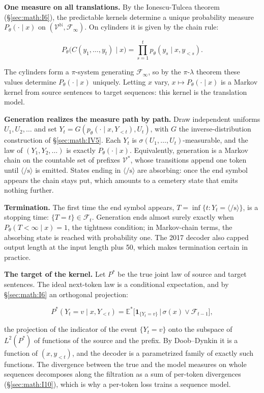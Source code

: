 \textbf{One measure on all translations.} By the Ionescu-Tulcea theorem
(\S\ref{sec:math:I6}), the predictable kernels determine a unique probability measure
\(P_\theta(\cdot \mid x)\) on \((\mathcal{V}^{\mathbb{N}}, \mathcal{F}_\infty)\). On cylinders
it is given by the chain rule:

\[
P_\theta\big(C(y_1,\dots,y_t)\mid x\big) = \prod_{s=1}^{t} p_\theta(y_s \mid x, y_{<s}).
\]

The cylinders form a \(\pi\)-system generating \(\mathcal{F}_\infty\), so by the \(\pi\)-\(\lambda\) theorem
these values determine \(P_\theta(\cdot \mid x)\) uniquely. Letting \(x\) vary, \(x \mapsto P_\theta(\cdot
\mid x)\) is a Markov kernel from source sentences to target sequences: this
kernel is the translation model.

\textbf{Generation realizes the measure path by path.} Draw independent
uniforms \(U_{1}, U_{2}, \ldots\) and set \(Y_t = G(p_\theta(\cdot \mid x,
Y_{<t}), U_t)\), with \(G\) the inverse-distribution construction
of \S\ref{sec:math:IV5}. Each \(Y_t\) is \(\sigma(U_1, \ldots, U_t)\)-measurable, and the law of \((Y_{1},
Y_{2}, \ldots)\) is exactly \(P_\theta(\cdot \mid x)\). Equivalently, generation is a
Markov chain on the countable set of prefixes \(\mathcal{V}^*\), whose
transitions append one token until \(\langle/\mathrm{s}\rangle\) is emitted. States ending in
\(\langle/\mathrm{s}\rangle\) are absorbing: once the end symbol appears the chain stays
put, which amounts to a cemetery state that emits nothing further.

\textbf{Termination.} The first time the end symbol appears, \(T = \inf\{t
: Y_t = \langle/\mathrm{s}\rangle\}\), is a stopping time: \(\{T = t\} \in \mathcal{F}_t\). Generation ends
almost surely exactly when \(P_\theta(T < \infty \mid x) = 1\), the tightness
condition; in Markov-chain terms, the absorbing state is reached with
probability one. The 2017 decoder also capped output length at the input
length plus 50, which makes termination certain in practice.

\textbf{The target of the kernel.} Let \(P^*\) be the true joint law of
source and target sentences. The ideal next-token law is a conditional
expectation, and by \S\ref{sec:math:I6} an orthogonal projection:

\[
P^*(Y_t = v \mid x, Y_{<t}) = \mathbb E^*\big[\mathbf 1_{\{Y_t = v\}} \,\big|\, \sigma(x)\vee\mathcal F_{t-1}\big],
\]

the projection of the indicator of the event \(\{Y_t = v\}\) onto the
subspace of \(L^{2}(P^*)\) of functions of the source and the prefix. By
Doob--Dynkin it is a function of \((x, y_{<t})\), and the decoder is
a parametrized family of exactly such functions. The divergence between
the true and the model measures on whole sequences decomposes along the
filtration as a sum of per-token divergences (\S\ref{sec:math:I10}), which is why a
per-token loss trains a sequence model.

